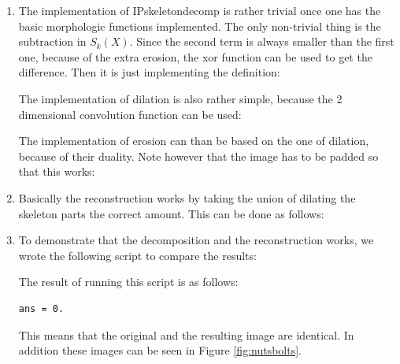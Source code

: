 \documentclass[a4paper]{article}
\begin{document}
\begin{enumerate}
\begin{proof}
\begin{align*}
          &= \left(X - \{z | (\hat{B})_{z} \cap \emptyset \neq \emptyset\}\right) \cup \bigcup_{k = 1}^K \left(\emptyset - \{z | (\hat{B})_{z} \cap \emptyset \neq \emptyset\}\right) \\
          &= \left(X - \{z | \emptyset \neq \emptyset\}\right) \cup \bigcup_{k = 1}^K \left(\emptyset - \{z | \emptyset \neq \emptyset\}\right) \\
          &= \left(X - \emptyset \right) \cup \bigcup_{k = 1}^K \left(\emptyset - \emptyset\right) \\
          &= X \cup \bigcup_{k = 1}^K \emptyset \\
          &= X \cup \emptyset \\
          &= X 
\end{align*}
\end{proof}
\item
The implementation of IPskeletondecomp is rather trivial once one has the basic morphologic functions implemented.
The only non-trivial thing is the subtraction in $S_k(X)$.
Since the second term is always smaller than the first one, because of the extra erosion, the xor function can be used to get the difference.
Then it is just implementing the definition:

The implementation of dilation is also rather simple, because the 2 dimensional convolution function can be used:

The implementation of erosion can than be based on the one of dilation, because of their duality.
Note however that the image has to be padded so that this works:

\item
Basically the reconstruction works by taking the union of dilating the skeleton parts the correct amount.
This can be done as follows:

\item
To demonstrate that the decomposition and the reconstruction works, we wrote the following script to compare the results:

The result of running this script is as follows:
\begin{lstlisting}
ans = 0.
\end{lstlisting}
This means that the original and the resulting image are identical.
In addition these images can be seen in Figure \ref{fig:nutsbolts}.
\begin{figure}[H]
\centering
\begin{tabular}{ccc}

\end{tabular}
\end{figure}
\end{enumerate}
\end{document}
